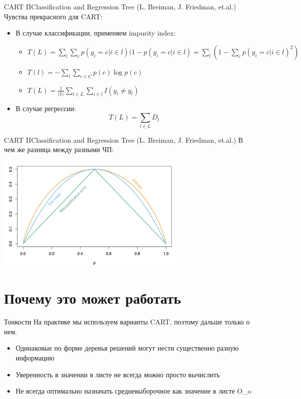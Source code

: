 \documentclass[14pt, fleqn, xcolor={dvipsnames, table}]{beamer}
\begin{document}
\begin{frame}{CART II}{Classification and Regression Tree (L. Breiman, J. Friedman, et.al.)}
Чувства прекрасного для CART:
\begin{itemize}
  \item В случае классификации, применяем impurity index:
  \begin{itemize}
    \item $T(L)  = \sum_l \sum_c p(y_i = c | i \in l)(1 - p(y_i=c|i \in l) = \sum_l (1 - \sum_c p(y_i=c|i \in l)^2)$
    \item $T(l) = -\sum_l\sum_{c\in C} p(c) \log p(c)$
    \item $T(L) = \frac{1}{|L|} \sum_{l\in L} \sum_{i \in l} I(y_i \ne y_l)$
  \end{itemize}
  \item В случае регрессии:
  $$
  T(L) = \sum_{l\in L} D_l
  $$
\end{itemize}
\end{frame}

\begin{frame}{CART II}{Classification and Regression Tree (L. Breiman, J. Friedman, et.al.)}
В чем же разница между разными ЧП:
\begin{center}
\includegraphics[width=0.7\textwidth]{Gini.png}
\end{center}
\end{frame}

\section{Почему это может работать}
\begin{frame}{Тонкости}
На практике мы используем варианты CART, поэтому дальше только о нем.
\begin{itemize}
  \item Одинаковые по форме деревья решений могут нести существенно разную информацию
  \item Уверенность в значении в листе не всегда можно просто вычислить
  \item Не всегда оптимально назначать средневыборочное как значение в листе O\_o
\end{itemize}
\end{frame}
\end{document}
